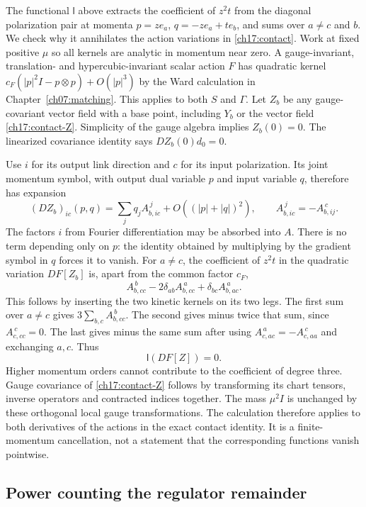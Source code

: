 The functional $\mathsf l$ above extracts the coefficient of $z^2t$
from the diagonal polarization pair at momenta
$p=ze_a$, $q=-ze_a+te_b$, and sums over $a\ne c$ and $b$.
We check why it annihilates the action variations in
\eqref{ch17:contact}. Work at fixed positive $\mu$ so all kernels
are analytic in momentum near zero. A gauge-invariant, translation- and
hypercubic-invariant scalar action $F$ has quadratic kernel
$c_F(|p|^2I-p\otimes p)+O(|p|^3)$ by the Ward calculation in
Chapter~\ref{ch07:matching}. This applies to both $S$ and $\Gamma$.
Let $Z_b$ be any gauge-covariant vector field with a base point, including $Y_b$
or the vector field \eqref{ch17:contact-Z}. Simplicity of the gauge
algebra implies $Z_b(0)=0$. The linearized covariance identity says
$DZ_b(0)d_0=0$.

Use $i$ for its output link direction and $c$ for its input polarization.
Its joint momentum symbol, with output dual variable $p$ and input
variable $q$, therefore has expansion
\[
 (DZ_b)_{ic}(p,q)=\sum_j q_j A_{b,ic}^{\,j}+O((|p|+|q|)^2),
 \qquad A_{b,ic}^{\,j}=-A_{b,ij}^{\,c}.
\]
The factors $i$ from Fourier differentiation may be absorbed into $A$.
There is no term depending only on $p$: the identity obtained by
multiplying by the gradient symbol in $q$ forces it to vanish.
For $a\ne c$, the coefficient of $z^2t$ in the quadratic variation
$DF[Z_b]$ is, apart from the common factor $c_F$,
\[
       A_{b,cc}^{\,b}-2\delta_{ab}A_{b,cc}^{\,a}
                              +\delta_{bc}A_{b,ac}^{\,a}.
\]
This follows by inserting the two kinetic kernels on its two legs.
The first sum over $a\ne c$ gives
$3\sum_{b,c}A_{b,cc}^{\,b}$. The second gives minus twice that sum,
since $A_{c,cc}^{\,c}=0$. The last gives minus the same sum after
using $A_{c,ac}^{\,a}=-A_{c,aa}^{\,c}$ and exchanging $a,c$.
Thus
\begin{equation}
                  \mathsf l(DF[Z])=0.
 \label{ch17:gradient-cancellation}
\end{equation}
Higher momentum orders cannot contribute to the coefficient of degree
three. Gauge covariance of \eqref{ch17:contact-Z} follows by transforming
its chart tensors, inverse operators and contracted indices together.
The mass $\mu^2I$ is unchanged by these orthogonal local gauge transformations.
The calculation therefore applies to both derivatives of the actions in the
exact contact identity. It is a finite-momentum cancellation, not a
statement that the corresponding functions vanish pointwise.

\subsection{Power counting the regulator remainder}

